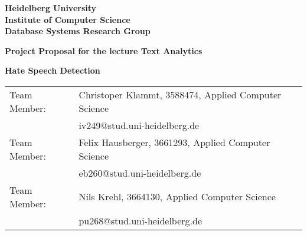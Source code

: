 \documentclass[
     12pt,         %
     a4paper,      %
     BCOR10mm,     %
     DIV14,        %
     ]{article}
\begin{document}
\begin{titlepage}

\vspace*{1cm}
\begin{center}
\vspace*{3cm}
\textbf{ 
\Large Heidelberg University\\
\smallskip
\Large Institute of Computer Science\\
\smallskip
\Large Database Systems Research Group\\
\smallskip
}

\vspace{3cm}

\textbf{\large Project Proposal for the lecture Text Analytics}

\vspace{0.5\baselineskip}
{\huge
\textbf{Hate Speech Detection}
}
\end{center}

\vfill 

{\large
\begin{tabular}[l]{ll}
Team Member: & Christoper Klammt, 3588474, Applied Computer Science\\
  & iv249@stud.uni-heidelberg.de\\
Team Member: & Felix Hausberger, 3661293, Applied Computer Science\\
  & eb260@stud.uni-heidelberg.de\\
Team Member: & Nils Krehl, 3664130, Applied Computer Science\\
  & pu268@stud.uni-heidelberg.de\\
  
\end{tabular}
}

\end{titlepage}









\newpage
\printbibliography
\end{document}
